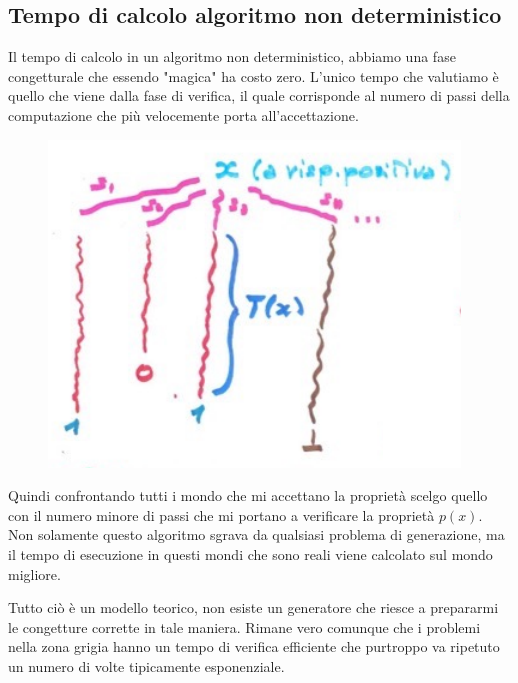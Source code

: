 \documentclass{article}
\begin{document}
\subsection{Tempo di calcolo algoritmo non deterministico}
Il tempo di calcolo in un algoritmo non deterministico, abbiamo una fase congetturale
che essendo "magica" ha costo zero. L'unico tempo che valutiamo è quello che viene
dalla fase di verifica, il quale corrisponde al numero di passi della computazione che più
velocemente porta all'accettazione.
\begin{figure}[H]
    \centering
    \includegraphics[scale=0.6]{images/tempondet.png}
\end{figure}
Quindi confrontando tutti i mondo che mi accettano la proprietà scelgo quello con il numero
minore di passi che mi portano a verificare la proprietà $p(x)$. Non solamente questo algoritmo
sgrava da qualsiasi problema di generazione, ma il tempo di esecuzione in questi mondi
che sono reali viene calcolato sul mondo migliore.

Tutto ciò è un modello teorico, non esiste un generatore che riesce a prepararmi le congetture
corrette in tale maniera. Rimane vero comunque che i problemi nella zona grigia hanno un tempo
di verifica efficiente che purtroppo va ripetuto un numero di volte
tipicamente esponenziale.
\end{document}
